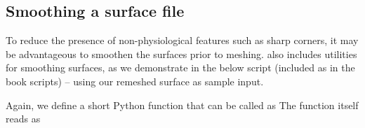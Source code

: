 \subsection{Smoothing a surface file}
\label{subsubsec:chp3:mesh-creation:smoothing}

To reduce the presence of non-physiological features such as sharp
corners, it may be advantageous to smoothen the surfaces prior to
meshing. \svmtk{} also includes utilities for smoothing surfaces, as
we demonstrate in the below script (included as
 in the book scripts) -- using
our remeshed surface  as sample input.

Again, we define a short Python function
 that can be called as
\noindent The function itself reads as

